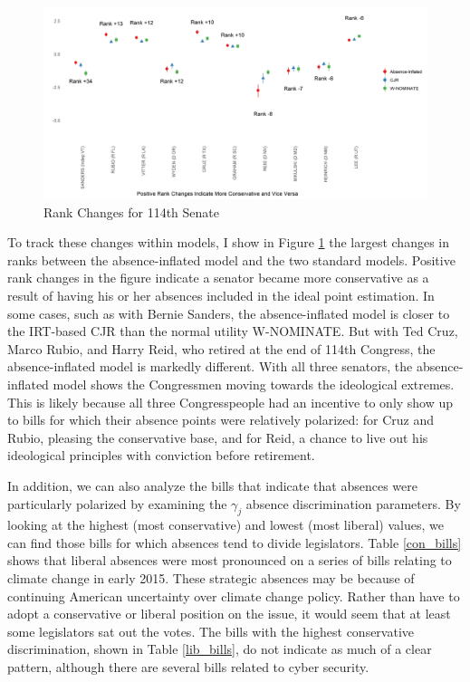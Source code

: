 	\begin{figure}
		\centering
		\caption{Rank Changes for 114th Senate}\label{rank_sen}
		\includegraphics[width=\linewidth]{big_diff}
	\end{figure}
	
	To track these changes within models, I show in Figure \ref{rank_sen} the largest changes in ranks between the absence-inflated model and the two standard models. Positive rank changes in the figure indicate a senator became more conservative as a result of having his or her absences included in the ideal point estimation. In some cases, such as with Bernie Sanders, the absence-inflated model is closer to the IRT-based CJR than the normal utility W-NOMINATE. But with Ted Cruz, Marco Rubio, and Harry Reid, who retired at the end of 114th Congress, the absence-inflated model is markedly different. With all three senators, the absence-inflated model shows the Congressmen moving towards the ideological extremes. This is likely because all three Congresspeople had an incentive to only show up to bills for which their absence points were relatively polarized: for Cruz and Rubio, pleasing the conservative base, and for Reid, a chance to live out his ideological principles with conviction before retirement.
	
	In addition, we can also analyze the bills that indicate that absences were particularly polarized by examining the $\gamma_j$ absence discrimination parameters. By looking at the highest (most conservative) and lowest (most liberal) values, we can find those bills for which absences tend to divide legislators. Table \ref{con_bills} shows that liberal absences were most pronounced on a series of bills relating to climate change in early 2015. These strategic absences may be because of continuing American uncertainty over climate change policy. Rather than have to adopt a conservative or liberal position on the issue, it would seem that at least some legislators sat out the votes. The bills with the highest conservative discrimination, shown in Table \ref{lib_bills}, do not indicate as much of a clear pattern, although there are several bills related to cyber security.
	

